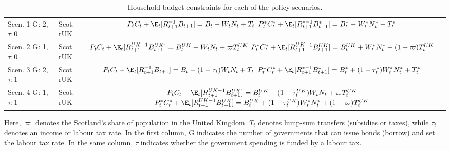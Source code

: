 \begin{table}[H]
    \centering
    \renewcommand{\arraystretch}{2}
    \begin{tabular}{l|l|c}
    \makecell{Scen. 1 \\ G: 2, $\tau: 0$} & \makecell{Scot. \\ rUK } & 
        \makecell{
            $P_t C_t + \E_t [{R^{-1}_{t+1}}B_{t+1}] = B_t + W_t N_t + T_t$ \\
            $P^*_t C^*_t + \E_t [{R^{*-1}_{t+1}}B^*_{t+1}] = B^*_t + W^*_t N^*_t + T^*_t$
        }  \\ 
    \makecell{Scen. 2 \\ G: 1, $\tau: 0$} & \makecell{Scot. \\ rUK } & 
        \makecell{
            $P_t C_t + \E_t [{R^{UK-1}_{t+1}}B^{UK}_{t+1}] = B^{UK}_t + W_t N_t + \varpi T^{UK}_t$ \\
            $P^*_t C^*_t + \E_t [{R^{UK-1}_{t+1}}B^{UK}_{t+1}] = B^{UK}_t + W^*_t N^*_t + (1-\varpi)T^{UK}_t$
        }   \\ 
    \makecell{Scen. 3 \\ G: 2, $\tau: 1$} & \makecell{Scot. \\ rUK } & 
    \makecell{
        $P_t C_t + \E_t [{R^{-1}_{t+1}}B_{t+1}] = B_t + (1-\tau_t)W_t N_t + T_t$ \\
        $P^*_t C^*_t + \E_t [{R^{*-1}_{t+1}}B^*_{t+1}] = B^*_t + (1-\tau^*_t)W^*_t N^*_t + T^*_t$ 
    }  \\
    \makecell{Scen. 4 \\ G: 1, $\tau: 1$} & \makecell{Scot. \\ rUK } & 
    \makecell{
        $P_t C_t + \E_t [{R^{UK-1}_{t+1}}B^{UK}_{t+1}] = B^{UK}_t + (1-\tau^{UK}_t)W_t N_t + \varpi T^{UK}_t$ \\
        $P^*_t C^*_t + \E_t [{R^{UK-1}_{t+1}}B^{UK}_{t+1}] = B^{UK}_t + (1-\tau^{UK}_t)W^*_t N^*_t + (1-\varpi)T^{UK}_t$
    }  
    \end{tabular}
    \caption{Household budget constraints for each of the policy scenarios.}
\end{table}
Here, $\varpi$ denotes the Scotland's share of population in the United Kingdom. $T_t$ denotes lump-sum transfers (subsidies or taxes), while $\tau_t$ denotes an income or labour tax rate. In the first column, G indicates the number of governments that can issue bonds (borrow) and set the labour tax rate. In the same column, $\tau$ indicates whether the government spending is funded by a labour tax.


